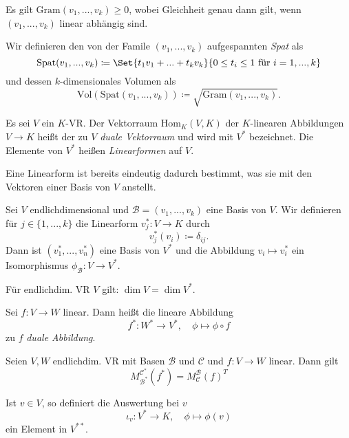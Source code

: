 \documentclass{cheat-sheet}
\newcommand{\Gram}{\mathrm{Gram}}
\newcommand{\Spat}{\mathrm{Spat}}
\newcommand{\Vol}{\mathrm{Vol}}
\newcommand{\Hom}{\mathrm{Hom}}
\newcommand{\BB}{\mathcal{B}}
\newcommand{\BC}{\mathcal{C}}
\begin{document}
\begin{satz}
Es gilt $\Gram(v_1, ..., v_k) \ge 0$, wobei Gleichheit genau dann gilt, wenn $(v_1, ..., v_k)$ linear abhängig sind.
\end{satz}

\begin{defn}
Wir definieren den von der Famile $(v_1, ..., v_k)$ aufgespannten \emph{Spat} als
\[ \Spat(v_1, ..., v_k) \coloneqq \Set{ t_1 v_1 + ... + t_k v_k }{ 0 \le t_i \le 1 \text{ für } i = 1, ..., k } \]
und dessen $k$-dimensionales Volumen als
\[ \Vol(\Spat(v_1, ..., v_k)) \coloneqq \sqrt{ \Gram(v_1, ..., v_k) }. \]
\end{defn}

\begin{defn}
Es sei $V$ ein $K$-VR. Der Vektorraum $\Hom_K(V, K)$ der $K$-linearen Abbildungen $V \to K$ heißt der zu $V$ \emph{duale Vektorraum} und wird mit $V^*$ bezeichnet. Die Elemente von $V^*$ heißen \emph{Linearformen} auf $V$.
\end{defn}

\begin{bem}
Eine Linearform ist bereits eindeutig dadurch bestimmt, was sie mit den Vektoren einer Basis von $V$ anstellt.
\end{bem}

\begin{satz}
Sei $V$ endlichdimensional und $\BB = (v_1, ..., v_k)$ eine Basis von $V$. Wir definieren für $j \in \{ 1, ..., k \}$ die Linearform $v_j^* : V \to K$ durch
\[ v_j^*(v_i) \coloneqq \delta_{ij}. \]
Dann ist $(v_1^*, ..., v_n^*)$ eine Basis von $V^*$ und die Abbildung $v_i \mapsto v_i^*$ ein Isomorphismus $\phi_{\BB} : V \to V^*$.
\end{satz}

\begin{kor}
Für endlichdim. VR $V$ gilt: $\dim V = \dim V^*$.
\end{kor}

\begin{defn}
Sei $f : V \to W$ linear. Dann heißt die lineare Abbildung
\[ f^* : W^* \to V^*, \quad \phi \mapsto \phi \circ f \]
zu $f$ \emph{duale Abbildung}.
\end{defn}

\begin{satz}
Seien $V, W$ endlichdim. VR mit Basen $\BB$ und $\BC$ und $f : V \to W$ linear. Dann gilt
\[ M_{\BB^*}^{\BC^*}(f^*) = M_{\BC}^{\BB}(f)^T \]
\end{satz}

\begin{defn}
Ist $v \in V$, so definiert die Auswertung bei $v$
\[ \iota_v : V^* \to K, \quad \phi \mapsto \phi(v) \]
ein Element in $V^{**}$.
\end{defn}
\end{document}
